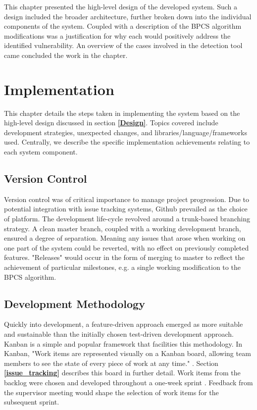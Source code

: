 \documentclass{l4proj}
\begin{document}
This chapter presented the high-level design of the developed system. Such a design included the broader architecture, further broken down into the individual components of the system. Coupled with a description of the BPCS algorithm modifications was a justification for why each would positively address the identified vulnerability. An overview of the cases involved in the detection tool came concluded the work in the chapter.

\chapter{Implementation}\label{Implementation}

This chapter details the steps taken in implementing the system based on the high-level design discussed in section \textbf{\ref{Design}}. Topics covered include development strategies, unexpected changes, and libraries/language/frameworks used. Centrally, we describe the specific implementation achievements relating to each system component.

\section{Version Control}

Version control \citep{version_control} was of critical importance to manage project progression. Due to potential integration with issue tracking systems, Github prevailed as the choice of platform. The development life-cycle revolved around a trunk-based branching strategy. A clean master branch, coupled with a working development branch, ensured a degree of separation. Meaning any issues that arose when working on one part of the system could be reverted, with no effect on previously completed features. "Releases" would occur in the form of merging to master to reflect the achievement of particular milestones, e.g. a single working modification to the BPCS algorithm.

\section{Development Methodology}\label{development_methodology}

Quickly into development, a feature-driven approach emerged as more suitable and sustainable than the initially chosen test-driven development approach. Kanban is a simple and popular framework that facilities this methodology. In Kanban, "Work items are represented visually on a Kanban board, allowing team members to see the state of every piece of work at any time." \citep{kanban}. Section \textbf{\ref{issue_tracking}} describes this board in further detail. Work items from the backlog were chosen and developed throughout a one-week sprint \citep{sprints}. Feedback from the supervisor meeting would shape the selection of work items for the subsequent sprint.
\end{document}
